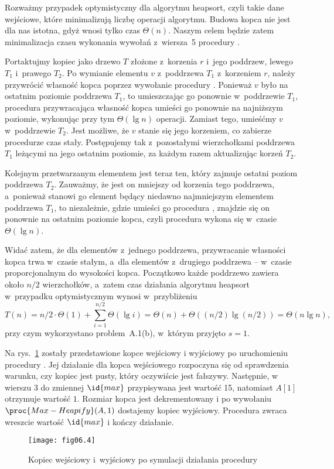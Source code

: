 \exercise %
Rozważmy przypadek optymistyczny dla algorytmu heapsort, czyli takie dane wejściowe, które minimalizują liczbę operacji algorytmu. Budowa kopca nie jest dla nas istotna, gdyż wnosi tylko czas $\Theta(n)$. Naszym celem będzie zatem minimalizacja czasu wykonania wywołań  z~wiersza~5 procedury .

Portaktujmy kopiec jako drzewo $T$ złożone z~korzenia $r$ i~jego poddrzew, lewego $T_1$ i~prawego $T_2$. Po wymianie elementu $v$ z~poddrzewa $T_1$ z~korzeniem $r$, należy przywrócić własność kopca poprzez wywołanie procedury . Ponieważ $v$ było na ostatnim poziomie poddrzewa $T_1$, to umieszczając go ponownie w~poddrzewie $T_1$, procedura przywracająca własność kopca umieści go ponownie na najniższym poziomie, wykonując przy tym $\Theta(\lg n)$ operacji. Zamiast tego, umieśćmy $v$ w~poddrzewie $T_2$. Jest możliwe, że $v$ stanie się jego korzeniem, co zabierze procedurze  czas stały. Postępujemy tak z~pozostałymi wierzchołkami poddrzewa $T_1$ leżącymi na jego ostatnim poziomie, za każdym razem aktualizując korzeń $T_2$.

Kolejnym przetwarzanym elementem jest teraz ten, który zajmuje ostatni poziom poddrzewa $T_2$. Zauważmy, że jest on mniejszy od korzenia tego poddrzewa, a~ponieważ stanowi go element będący niedawno najmniejszym elementem poddrzewa $T_1$, to niezależnie, gdzie umieści go procedura , znajdzie się on ponownie na ostatnim poziomie kopca, czyli procedura wykona się w~czasie $\Theta(\lg n)$.

Widać zatem, że dla elementów z~jednego poddrzewa, przywracanie własności kopca trwa w~czasie stałym, a~dla elementów z~drugiego poddrzewa -- w~czasie proporcjonalnym do wysokości kopca. Początkowo każde poddrzewo zawiera około $n/2$ wierzchołków, a~zatem czas działania algorytmu heapsort w~przypadku optymistycznym wynosi w~przybliżeniu
\[
	T(n) = n/2\cdot\Theta(1)+\sum_{i=1}^{n/2}\Theta(\lg i) = \Theta(n)+\Theta((n/2)\lg(n/2)) = \Theta(n\lg n),
\]
przy czym wykorzystano problem~A.1(b), w~którym przyjęto $s=1$.


\exercise %
Na rys.~\ref{fig:6.5-1} zostały przedstawione kopce wejściowy i wyjściowy po uruchomieniu procedury . Jej działanie dla kopca wejściowego rozpoczyna się od sprawdzenia warunku, czy kopiec jest pusty, który oczywiście jest fałszywy. Następnie, w wierszu 3 do zmiennej $\id{max}$ przypisywana jest wartość 15, natomiast $A[1]$ otrzymuje wartość $1$. Rozmiar kopca jest dekrementowany i po wywołaniu $\proc{Max-Heapify}(A,1)$ dostajemy kopiec wyjściowy. Procedura zwraca wreszcie wartość $\id{max}$ i kończy działanie.
\begin{figure}[ht]
	\begin{center}
		\texttt{[image: fig06.4]}
	\end{center}
	\caption{Kopiec wejściowy i~wyjściowy po symulacji działania procedury } \label{fig:6.5-1}
\end{figure}

